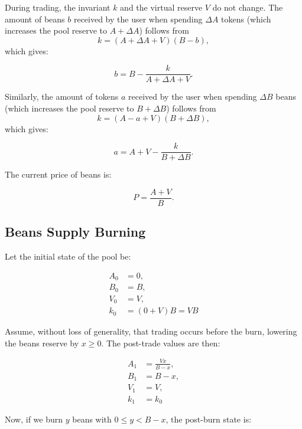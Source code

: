 \documentclass[11pt,a4paper]{article}
\theoremstyle{definition}
\begin{document}
During trading, the invariant $k$ and the virtual reserve $V$ do not change. The amount of beans $b$ received by the user when spending $\Delta A$ tokens (which increases the pool reserve to $A+\Delta A$) follows from
\begin{equation}
    k = (A+\Delta A+V)(B-b),
\end{equation}
which gives:

\begin{equation}
    b = B - \frac{k}{A+\Delta A+V}.
\end{equation}

Similarly, the amount of tokens $a$ received by the user when spending $\Delta B$ beans (which increases the pool reserve to $B+\Delta B$) follows from
\begin{equation}
    k = (A-a+V)(B+\Delta B),
\end{equation}
which gives:

\begin{equation}
    a = A+V - \frac{k}{B+\Delta B}.
\end{equation}

The current price of beans is:

\begin{equation}
    P = \frac{A+V}{B}.
\end{equation}

\subsection{Beans Supply Burning}

Let the initial state of the pool be:

\begin{align*}
    A_0 &= 0, \\
    B_0 &= B, \\
    V_0 &= V, \\
    k_0 &= (0+V)B = VB
\end{align*}

Assume, without loss of generality, that trading occurs before the burn, lowering the beans reserve by $x \geq 0$. The post-trade values are then:

\begin{align*}
    A_1 &= \frac{Vx}{B-x}, \\
    B_1 &= B - x, \\
    V_1 &= V, \\
    k_1 &= k_0
\end{align*}

Now, if we burn $y$ beans with $0 \leq y < B - x$, the post-burn state is:
\end{document}
